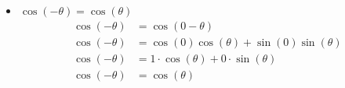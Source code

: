 \documentclass[12pt]{article}
\begin{document}
\begin{itemize}
    \item $\cos(- \theta) = \cos(\theta)$
        \begin{align*}
            \cos(-\theta) &= \cos(0 - \theta) \\
            \cos(-\theta) &= \cos(0)\cos(\theta) + \sin(0)\sin(\theta) \\
            \cos(-\theta) &= 1 \cdot \cos(\theta) + 0 \cdot \sin(\theta) \\
            \cos(-\theta) &= \cos(\theta)  \tag*{$\square$}
        \end{align*}
\end{itemize}
\end{document}
